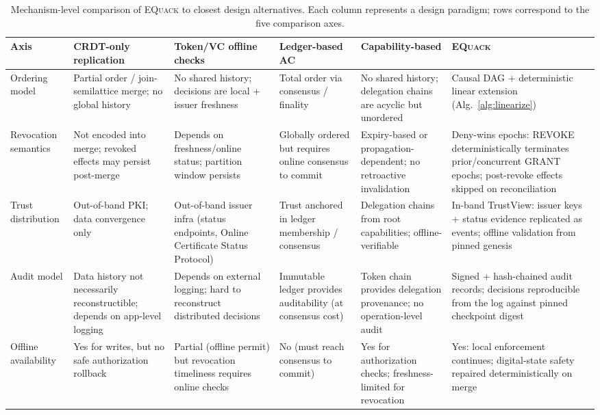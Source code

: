 \documentclass[10pt,journal,compsoc]{IEEEtran}
\newcommand{\equack}{\textsc{EQuack}}
\begin{document}
\begin{table}[!t]
\centering
\caption{Mechanism-level comparison of \equack{} to closest design alternatives. Each column represents a design paradigm; rows correspond to the five comparison axes.}
\label{tab:mech-compare}
\footnotesize
\setlength{\tabcolsep}{4pt}
\renewcommand{\arraystretch}{1.25}
\begin{tabular}{p{1.6cm} p{2.4cm} p{2.4cm} p{2.4cm} p{2.4cm} p{3.0cm}}
\toprule
\textbf{Axis} & \textbf{CRDT-only replication} & \textbf{Token/VC offline checks} & \textbf{Ledger-based AC} & \textbf{Capability-based} & \textbf{\equack{}} \\
\midrule
Ordering model &
  Partial order / join-semilattice merge; no global history &
  No shared history; decisions are local + issuer freshness &
  Total order via consensus / finality &
  No shared history; delegation chains are acyclic but unordered &
  Causal DAG + deterministic linear extension (Alg.~\ref{alg:linearize}) \\
\addlinespace
Revocation semantics &
  Not encoded into merge; revoked effects may persist post-merge &
  Depends on freshness/online status; partition window persists &
  Globally ordered but requires online consensus to commit &
  Expiry-based or propagation-dependent; no retroactive invalidation &
  Deny-wins epochs: REVOKE deterministically terminates prior/concurrent GRANT epochs; post-revoke effects skipped on reconciliation \\
\addlinespace
Trust distribution &
  Out-of-band PKI; data convergence only &
  Out-of-band issuer infra (status endpoints, Online Certificate Status Protocol) &
  Trust anchored in ledger membership / consensus &
  Delegation chains from root capabilities; offline-verifiable &
  In-band TrustView: issuer keys + status evidence replicated as events; offline validation from pinned genesis \\
\addlinespace
Audit model &
  Data history not necessarily reconstructible; depends on app-level logging &
  Depends on external logging; hard to reconstruct distributed decisions &
  Immutable ledger provides auditability (at consensus cost) &
  Token chain provides delegation provenance; no operation-level audit &
  Signed + hash-chained audit records; decisions reproducible from the log against pinned checkpoint digest \\
\addlinespace
Offline availability &
  Yes for writes, but no safe authorization rollback &
  Partial (offline permit) but revocation timeliness requires online checks &
  No (must reach consensus to commit) &
  Yes for authorization checks; freshness-limited for revocation &
  Yes: local enforcement continues; digital-state safety repaired deterministically on merge \\
\bottomrule
\end{tabular}
\end{table}
\end{document}
